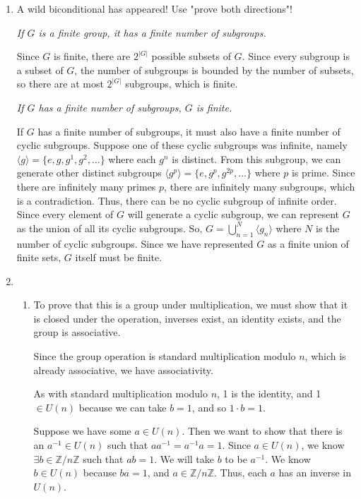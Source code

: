 \documentclass{article}
\begin{document}
\begin{enumerate}
    \item A wild biconditional has appeared! Use "prove both directions"!

    \textit{If $G$ is a finite group, it has a finite number of subgroups.}

    Since $G$ is finite, there are $2^{|G|}$ possible subsets of $G$. Since every subgroup is a subset of $G$, the number of subgroups is bounded by the number of subsets, so there are at most $2^{|G|}$ subgroups, which is finite. 

    \textit{If $G$ has a finite number of subgroups, $G$ is finite.}

    If $G$ has a finite number of subgroups, it must also have a finite number of cyclic subgroups. Suppose one of these cyclic subgroups was infinite, namely $\langle g \rangle = \{e, g, g^1, g^2, \dots\}$ where each $g^n$ is distinct. From this subgroup, we can generate other distinct subgroups $\langle g^p \rangle = \{e, g^{p}, g^{2p}, \dots\}$ where $p$ is prime. Since there are infinitely many primes $p$, there are infinitely many subgroups, which is a contradiction. Thus, there can be no cyclic subgroup of infinite order. Since every element of $G$ will generate a cyclic subgroup, we can represent $G$ as the union of all its cyclic subgroups. So, $G = \bigcup_{n=1}^N \langle g_n \rangle$ where $N$ is the number of cyclic subgroups. Since we have represented $G$ as a finite union of finite sets, $G$ itself must be finite. 

    \item 
        \begin{enumerate}
            \item To prove that this is a group under multiplication, we must show that it is closed under the operation, inverses exist, an identity exists, and the group is associative. 

            \smallskip

            Since the group operation is standard multiplication modulo $n$, which is already associative, we have associativity. 

            \smallskip

            As with standard multiplication modulo $n$, 1 is the identity, and 1 $\in U(n)$ because we can take $b=1$, and so $1\cdot b = 1$. 

            \smallskip

            Suppose we have some $a \in U(n)$. Then we want to show that there is an $a^{-1} \in U(n)$ such that $aa^{-1} = a^{-1}a = 1$. Since $a \in U(n)$, we know $\exists b \in \mathbb{Z}/n\mathbb{Z}$ such that $ab = 1$. We will take $b$ to be $a^{-1}$. We know $b \in U(n)$ because $ba = 1$, and $a \in \mathbb{Z}/n\mathbb{Z}$. Thus, each $a$ has an inverse in $U(n)$.


\end{enumerate}
\end{enumerate}
\end{document}
